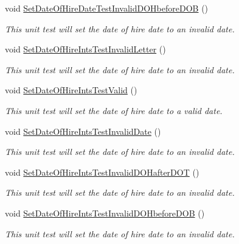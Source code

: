 \begin{DoxyCompactItemize}
void \hyperlink{class_my_all_employee_1_1_tests_1_1_full_time_employee_tests_a40aa8631bb91216a166885c55a65c506}{Set\+Date\+Of\+Hire\+Date\+Test\+Invalid\+D\+O\+Hbefore\+D\+O\+B} ()
\begin{DoxyCompactList}\small\item\em This unit test will set the date of hire date to an invalid date. \end{DoxyCompactList}\item 
void \hyperlink{class_my_all_employee_1_1_tests_1_1_full_time_employee_tests_a8db2a2084aa12703dde58c9dcf8d0ece}{Set\+Date\+Of\+Hire\+Ints\+Test\+Invalid\+Letter} ()
\begin{DoxyCompactList}\small\item\em This unit test will set the date of hire date to an invalid date. \end{DoxyCompactList}\item 
void \hyperlink{class_my_all_employee_1_1_tests_1_1_full_time_employee_tests_a45b2e90d3fed9ea7f7eec3c805e29972}{Set\+Date\+Of\+Hire\+Ints\+Test\+Valid} ()
\begin{DoxyCompactList}\small\item\em This unit test will set the date of hire date to a valid date. \end{DoxyCompactList}\item 
void \hyperlink{class_my_all_employee_1_1_tests_1_1_full_time_employee_tests_a74c777c5bac2bbd565153427beb75f3d}{Set\+Date\+Of\+Hire\+Ints\+Test\+Invalid\+Date} ()
\begin{DoxyCompactList}\small\item\em This unit test will set the date of hire date to an invalid date. \end{DoxyCompactList}\item 
void \hyperlink{class_my_all_employee_1_1_tests_1_1_full_time_employee_tests_a113325a9cea1175e54bf6a27a725f2f3}{Set\+Date\+Of\+Hire\+Ints\+Test\+Invalid\+D\+O\+Hafter\+D\+O\+T} ()
\begin{DoxyCompactList}\small\item\em This unit test will set the date of hire date to an invalid date. \end{DoxyCompactList}\item 
void \hyperlink{class_my_all_employee_1_1_tests_1_1_full_time_employee_tests_abed90ce94167001c8dd5957d7e898078}{Set\+Date\+Of\+Hire\+Ints\+Test\+Invalid\+D\+O\+Hbefore\+D\+O\+B} ()
\begin{DoxyCompactList}\small\item\em This unit test will set the date of hire date to an invalid date. \end{DoxyCompactList}\item 

\end{DoxyCompactItemize}
